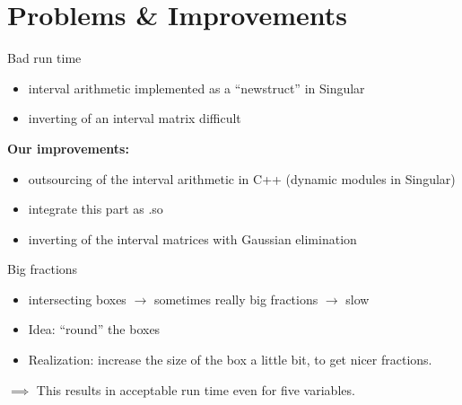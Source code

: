 \documentclass[german,10pt,xcolor=colortbl,compress,handout]{beamer}
\begin{document}
\section{Problems \& Improvements}
\begin{frame}{Bad run time}
    \begin{itemize}
        \item interval arithmetic implemented as a \enquote{newstruct} in Singular
        \item inverting of an interval matrix difficult
    \end{itemize}
    \bigskip
    \textbf{Our improvements:}
    \pause
    \begin{itemize}
        \item outsourcing of the interval arithmetic in C++ (dynamic modules in Singular)
        \item integrate this part as .so
        \item inverting of the interval matrices with Gaussian elimination
    \end{itemize}
\end{frame}

\begin{frame}{Big fractions}
    \begin{itemize}
        \pause
        \item intersecting boxes $\rightarrow$ sometimes really big fractions $\rightarrow$ slow
        \pause
        \item Idea: \enquote{round} the boxes
        \pause
        \item Realization: increase the size of the box a little bit, to get nicer fractions.
    \end{itemize}
    \bigskip
    \pause

    \begin{center}
    \end{center}
    \pause

    $\implies$ This results in acceptable run time even for five variables.
\end{frame}
\end{document}
